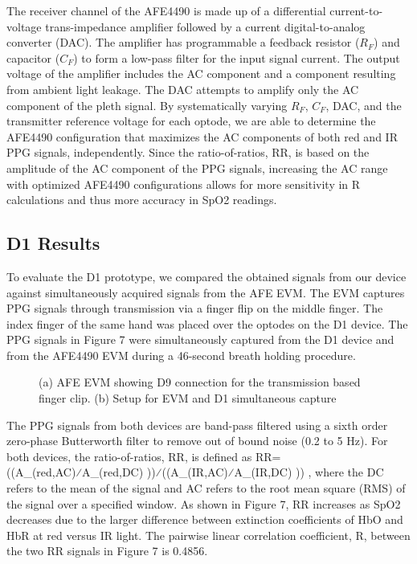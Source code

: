         The receiver channel of the AFE4490 is made up of a differential current-to-voltage trans-impedance amplifier followed by a current digital-to-analog converter (DAC). The amplifier has programmable a feedback resistor ($R_F$) and capacitor ($C_F$) to form a low-pass filter for the input signal current. The output voltage of the amplifier includes the AC component and a component resulting from ambient light leakage. The DAC attempts to amplify only the AC component of the pleth signal. By systematically varying $R_F$, $C_F$, DAC, and the transmitter reference voltage for each optode, we are able to determine the AFE4490 configuration that maximizes the AC components of both red and IR PPG signals, independently. Since the ratio-of-ratios, RR, is based on the amplitude of the AC component of the PPG signals, increasing the AC range with optimized AFE4490 configurations allows for more sensitivity in R calculations and thus more accuracy in SpO2 readings. 
        
    \subsection{D1 Results}
    To evaluate the D1 prototype, we compared the obtained signals from our device against simultaneously acquired signals from the AFE EVM. The EVM captures PPG signals through transmission via a finger flip on the middle finger. The index finger of the same hand was placed over the optodes on the D1 device. The PPG signals in Figure 7 were simultaneously captured from the D1 device and from the AFE4490 EVM during a 46-second breath holding procedure. 

    \begin{figure}
        \begin{center}
        \end{center}
        \caption{(a) AFE EVM showing D9 connection for the transmission based finger clip. (b) Setup for EVM and D1 simultaneous capture} 
        \label{fig:xx}
    \end{figure} 

    The PPG signals from both devices are band-pass filtered using a sixth order zero-phase Butterworth filter to remove out of bound noise (0.2 to 5 Hz). For both devices, the ratio-of-ratios, RR, is defined as RR=  ((A_(red,AC)⁄A_(red,DC) ))⁄((A_(IR,AC)⁄A_(IR,DC) ))  , where the DC refers to the mean of the signal and AC refers to the root mean square (RMS) of the signal over a specified window. As shown in Figure 7, RR increases as SpO2 decreases due to the larger difference between extinction coefficients of HbO and HbR at red versus IR light. The pairwise linear correlation coefficient, R, between the two RR signals in Figure 7 is 0.4856. 

